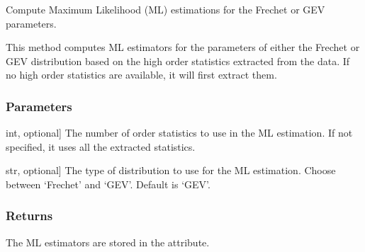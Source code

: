 \documentclass[a4paper,11pt,openany,english]{sphinxmanual}
\begin{document}
\begin{fulllineitems}
\begin{fulllineitems}
\begin{description}
\end{description}

\end{fulllineitems}


\begin{fulllineitems}
\label{\detokenize{api_topt:xtremes.topt.Data.get_ML_estimation}}
\pysigstartsignatures
{}
\pysigstopsignatures
\sphinxAtStartPar
Compute Maximum Likelihood (ML) estimations for the Frechet or GEV parameters.

\sphinxAtStartPar
This method computes ML estimators for the parameters of either the Frechet or GEV distribution based 
on the high order statistics extracted from the data. If no high order statistics are available, it 
will first extract them.


\subsubsection{Parameters}
\label{\detokenize{api_topt:id18}}\begin{description}
\sphinxlineitem{r}{[}int, optional{]}
\sphinxAtStartPar
The number of order statistics to use in the ML estimation. If not specified, it uses all the extracted statistics.

\sphinxlineitem{FrechetOrGEV}{[}str, optional{]}
\sphinxAtStartPar
The type of distribution to use for the ML estimation. Choose between ‘Frechet’ and ‘GEV’. Default is ‘GEV’.

\end{description}


\subsubsection{Returns}
\label{\detokenize{api_topt:id19}}\begin{description}
\sphinxAtStartPar
The ML estimators are stored in the  attribute.

\end{description}


\end{fulllineitems}
\end{fulllineitems}
\end{document}
